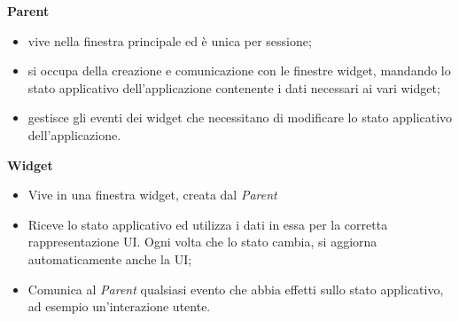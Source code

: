 \textbf{Parent}
    \begin{itemize}
        \item vive nella finestra principale ed è unica per sessione;
        \item si occupa della creazione e comunicazione con le finestre widget, mandando lo stato applicativo dell'applicazione contenente i dati necessari ai vari widget;
        \item gestisce gli eventi dei widget che necessitano di modificare lo stato applicativo dell'applicazione.
    \end{itemize}
\textbf{Widget}
    \begin{itemize}
        \item Vive in una finestra widget, creata dal \textit{Parent}
        \item Riceve lo stato applicativo ed utilizza i dati in essa per la corretta rappresentazione UI. Ogni volta che lo stato cambia, si aggiorna automaticamente anche la UI;
        \item Comunica al \textit{Parent} qualsiasi evento che abbia effetti sullo stato applicativo, ad esempio un'interazione utente.
    \end{itemize}

